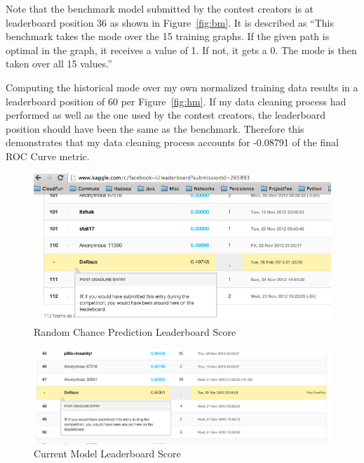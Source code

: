 \documentclass{article} %
\begin{document}
Note that the benchmark model submitted by the contest creators is at
leaderboard position 36 as shown in Figure~\ref{fig:bm}.  It is described as
``This benchmark takes the mode over the 15 training graphs. If the given
path is optimal in the graph, it receives a value of 1. If not, it gets a
0. The mode is then taken over all 15 values.''

Computing the historical mode over my own normalized training data results
in a leaderboard position of 60 per Figure~\ref{fig:hm}.  If my data
cleaning process had performed as well as the one used by the contest
creators, the leaderboard position should have been the same as the
benchmark.  Therefore this demonstrates that my data cleaning process
accounts for -0.08791 of the final ROC Curve metric.

\begin{figure}
  \begin{center}
    \includegraphics[scale=.4]{randomPredictions.png}
  \end{center}
  \caption{Random Chance Prediction Leaderboard Score}
  \label{fig:chance}
\end{figure}

\begin{figure}
  \begin{center}
    \includegraphics[scale=.4]{leaderboard.png}
  \end{center}
  \caption{Current Model Leaderboard Score}
  \label{fig:score}
\end{figure}
\end{document}
